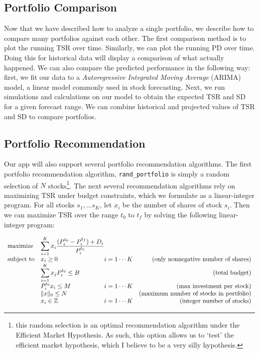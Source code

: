 \documentclass{article}
\begin{document}
\subsection{Portfolio Comparison}
Now that we have described how to analyze a single portfolio, we describe how to compare many portfolios against each other. The first comparison method is to plot the running TSR over time. Similarly, we can plot the running PD over time. Doing this for historical data will display a comparison of what actually happened. We can also compare the predicted performance in the following way: first, we fit our data to a \emph{Autoregressive Integrated Moving Average} (ARIMA) model, a linear model commonly used in stock forecasting. Next, we run simulations and calculations on our model to obtain the expected TSR and SD for a given forecast range. We can combine historical and projected values of TSR and SD to compare portfolios.

\subsection{Portfolio Recommendation}
Our app will also support several portfolio recommendation algorithms. The first portfolio recommendation algorithm, \texttt{rand\_portfolio} is simply a random selection of $N$ stocks\footnote{this random selection is an optimal recommendation algorithm under the Efficient Market Hypothesis. As such, this option allows us to `test' the efficient market hypothesis, which I believe to be a very silly hypothesis.}. The next several recommendation algorithms rely on maximizing TSR under budget constraints, which we formulate as a linear-integer program. For all stocks $s_1, \dots s_K$, let $x_i$ be the number of shares of stock $s_i$. Then we can maximize TSR over the range $t_0$ to $t_f$ by solving the following linear-integer program:

\begin{equation*}
\begin{array}{ll@{}lr}
\text{maximize}  & \displaystyle\sum\limits_{i=1}^{K} x_i \frac{(P^{t_0}_{i} - P^{t_f}_{i}) + D_i}{P^{t_0}_{i}}&&\\
\text{subject to}& x_i \geq 0 & i =1 \cdots K & \text{(only nonnegative number of shares)} \\
                & \displaystyle\sum\limits_{i=1}^{K} x_{j} P^{t_0}_{i}  \leq B &&\text{(total budget)}\\
                 &   P^{t_0}_i x_i \leq M &i =1 \cdots K & \text{(max investment per stock)} \\
                 &  \| x \|_0 \leq N && \text{(maximum number of stocks in portfolio)} \\
                 & x_i \in \mathbb{Z}  &i =1 \cdots K & \text{(integer number of stocks)} \\
\end{array}
\end{equation*}
\end{document}

